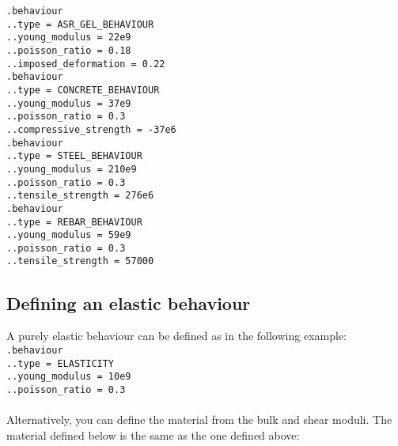 \documentclass[10pt]{article}
\begin{document}
\noindent \verb+.behaviour+\\
\verb+..type = ASR_GEL_BEHAVIOUR+\\
\verb+..young_modulus = 22e9+\\
\verb+..poisson_ratio = 0.18+\\
\verb+..imposed_deformation = 0.22+\\

\noindent \verb+.behaviour+\\
\verb+..type = CONCRETE_BEHAVIOUR+\\
\verb+..young_modulus = 37e9+\\
\verb+..poisson_ratio = 0.3+\\
\verb+..compressive_strength = -37e6+\\

\noindent \verb+.behaviour+\\
\verb+..type = STEEL_BEHAVIOUR+\\
\verb+..young_modulus = 210e9+\\
\verb+..poisson_ratio = 0.3+\\
\verb+..tensile_strength = 276e6+\\

\noindent \verb+.behaviour+\\
\verb+..type = REBAR_BEHAVIOUR+\\
\verb+..young_modulus = 59e9+\\
\verb+..poisson_ratio = 0.3+\\
\verb+..tensile_strength = 57000+

\subsection{Defining an elastic behaviour}

A purely elastic behaviour can be defined as in the following example:\\

\noindent \verb+.behaviour+\\
\verb+..type = ELASTICITY+\\
\verb+..young_modulus = 10e9+\\
\verb+..poisson_ratio = 0.3+

\paragraph{} Alternatively, you can define the material from the bulk and shear moduli. The material defined below is the same as the one defined above:\\
\end{document}
